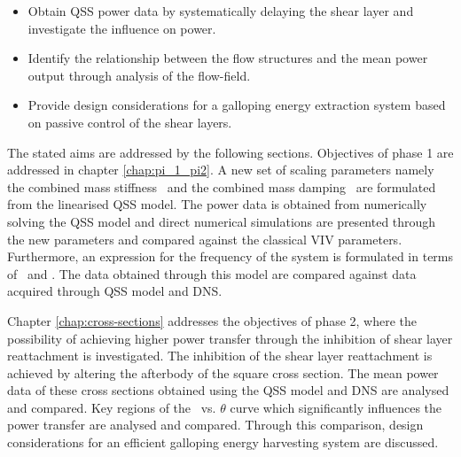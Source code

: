   \begin{itemize}
  	\item Obtain QSS power data by systematically delaying the shear layer and investigate the influence on power.
  	\item Identify the relationship between the flow structures and the mean power output through analysis of the flow-field.
  	\item Provide design considerations for a galloping energy extraction system based on passive control of the shear layers. 
  \end{itemize}
 
 
 The stated aims are addressed by the following sections. Objectives of phase 1 are addressed in chapter \ref{chap:pi_1_pi2}. A new set of scaling parameters namely the combined mass stiffness \massstiff\ and the combined mass damping \massdamp\ are formulated from the linearised QSS model. The power data is obtained from numerically solving the QSS model and direct numerical simulations are presented through the new parameters and compared against the classical VIV parameters. Furthermore, an expression for the frequency of the system is formulated in terms of \massstiff\ and \massdamp. The data obtained through this model are compared against data acquired through QSS model and DNS. 
 
 
 Chapter \ref{chap:cross-sections} addresses the objectives of phase 2, where the possibility of achieving higher power transfer through the inhibition of shear layer reattachment is investigated. The inhibition of the shear layer reattachment is achieved by altering the afterbody of the square cross section. The mean power data of these cross sections obtained using the QSS model and DNS are analysed and compared. Key regions of the \cy\ vs. $\theta$ curve which significantly influences the power transfer are analysed and compared. Through this comparison, design considerations for an efficient galloping energy harvesting system are discussed.        
